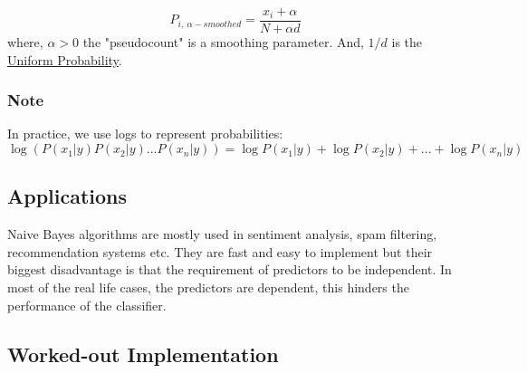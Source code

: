 	\begin{equation}
		P_{i,\ \alpha-smoothed} = \frac{x_i+\alpha}{N+\alpha d}
	\end{equation}
	where, $\alpha > 0$ the "pseudocount" is a smoothing parameter. And, $1/d$ is the \href{https://en.wikipedia.org/wiki/Discrete_uniform_distribution}{Uniform Probability}.

	\subsubsection*{Note}
	In practice, we use logs to represent probabilities:
	\begin{equation}
		\log{(P(x_1|y)P(x_2|y)...P(x_n|y))} = \log{P(x_1|y)} + \log{P(x_2|y)} +...+ \log{P(x_n|y)}
	\end{equation}


\subsection*{Applications}
	Naive Bayes algorithms are mostly used in sentiment analysis, spam filtering, recommendation systems etc. They are fast and easy to implement but their biggest disadvantage is that the requirement of predictors to be independent. In most of the real life cases, the predictors are dependent, this hinders the performance of the classifier.

\subsection*{Worked-out Implementation}

